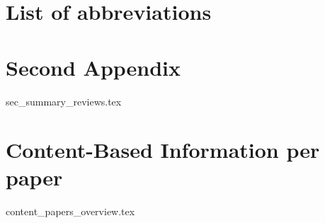\begin{appendices}

\section{List of abbreviations}
\printnomenclature


\clearpage
\section{Second Appendix}
{sec_summary_reviews.tex}


\clearpage
\section{Content-Based Information per paper}
{content_papers_overview.tex}
\end{appendices}